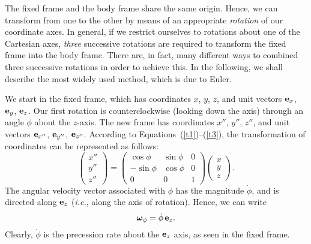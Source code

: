 The fixed frame and the body frame share the
same origin. Hence, we can transform from one to the other by
means of an appropriate {\em rotation}\/ of our coordinate axes.
In general, if we restrict ourselves to rotations about one of the Cartesian 
axes,   {\em three}\/ successive rotations are required to
transform the fixed frame into the body frame. There are, in fact, many different
ways to combined three successive rotations in order to achieve this. In the following, we shall describe the
most widely used method, which is due to Euler.

We start in the fixed frame, which has coordinates $x$, $y$, $z$, and
unit vectors ${\bf e}_x$, ${\bf e}_y$, ${\bf e}_z$.  Our first rotation
is counterclockwise (looking down the axis) through an angle $\phi$ about the $z$-axis. The new frame has coordinates $x''$, $y''$, $z''$, and
unit vectors ${\bf e}_{x''}$, ${\bf e}_{y''}$, ${\bf e}_{z''}$. According
to Equations~(\ref{t1})--(\ref{t3}), the transformation of coordinates can be represented as
follows:
\begin{equation}\label{e9.72}
\left(\begin{array}{c}x''\\y''\\z''\end{array}\right)=
\left(\begin{array}{ccc}
\cos\phi&\sin\phi&0\\
-\sin\phi&\cos\phi&0\\
0&0&1
\end{array}\right)\left(\begin{array}{c}x\\y\\z\end{array}\right).
\end{equation}
The angular velocity vector associated with $\phi$ has the magnitude $\dot{\phi}$, 
and is directed along ${\bf e}_z$ ({\em i.e.}, along the axis of rotation).
Hence, we can write
\begin{equation}\label{e9.73}
\mbox{\boldmath$\omega$}_\phi = \dot{\phi}\,{\bf e}_z.
\end{equation}
Clearly, $\dot{\phi}$ is the precession rate about the ${\bf e}_z$ axis,
as seen in the fixed frame.

